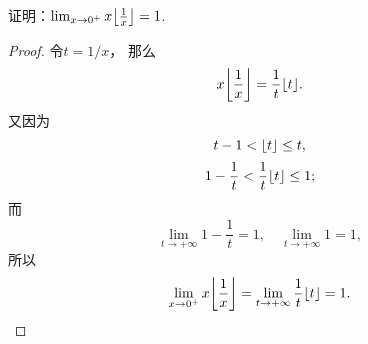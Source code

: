 \begin{example}
证明：\(\lim_{x\to0^+} x \floor*{\frac1x} = 1\).
\begin{proof}
令\(t=1/x\)，
那么\[
	x \floor*{\frac1x} = \frac{1}{t} \floor{t}.
\]
又因为\[
	t - 1 < \lfloor t\rfloor \leq t,
\]\[
	1 - \frac{1}{t} < \frac{1}{t} \lfloor t\rfloor \leq 1;
\]
而\[
	\lim_{t\to+\infty} 1 - \frac{1}{t} = 1,
	\quad
	\lim_{t\to+\infty} 1 = 1,
\]
所以\[
	\lim_{x\to0^+} x \floor*{\frac1x} = \lim_{t\to+\infty} \frac{1}{t} \floor{t} = 1.
	\qedhere
\]
\end{proof}
\end{example}


